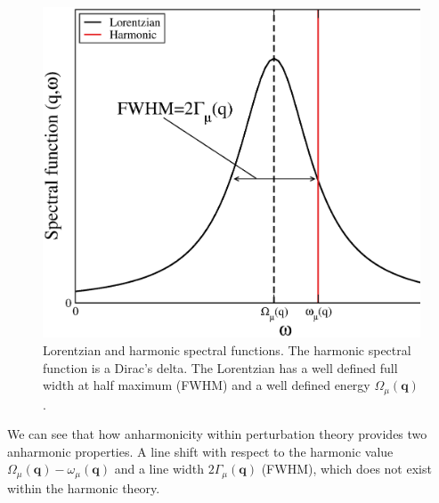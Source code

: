 \begin{figure}[h]
\begin{center}
\includegraphics[width=0.9\linewidth]{Figures/ins-toy1.eps}
\caption[Lorentzian and harmonic spectral functions]{Lorentzian and harmonic spectral functions. The harmonic spectral function is a Dirac's delta. The Lorentzian has a well defined full width at half maximum (FWHM) and a well defined energy $\Omega_{\mu}(\boldsymbol{q})$.}
\label{instoy}
\end{center}
\end{figure}
We can see that how anharmonicity within perturbation theory provides two anharmonic properties. A line shift with respect to the harmonic value $\Omega_{\mu}(\mathbf{q})-\omega_{\mu}(\mathbf{q})$ and a line width $2\Gamma_{\mu}(\mathbf{q})$ (FWHM), which does not exist within the harmonic theory. \\

